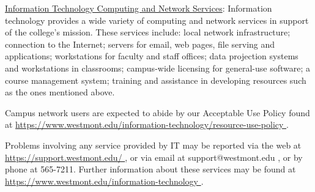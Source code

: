 		\underline{Information Technology Computing and Network Services}:  Information technology provides a wide variety of computing and network services in support of the college's mission.  These services include:  local network infrastructure; connection to the Internet; servers for email, web pages, file serving and applications; workstations for faculty and staff offices; data projection systems and workstations in classrooms; campus-wide licensing for general-use software; a course management system; training and assistance in developing resources such as the ones mentioned above.

		Campus network users are expected to abide by our Acceptable Use Policy found at
		\href{
			https://www.westmont.edu/information-technology/resource-use-policy
		}{\url{
				https://www.westmont.edu/information-technology/resource-use-policy
			}}
		.

		Problems involving any service provided by IT may be reported via the web at
		\href{
			https://support.westmont.edu/
		}{\url{
				https://support.westmont.edu/
			}}
		,
		or via email at support@westmont.edu
		,
		or by phone at 565-7211.  Further information about these services may be found at
		\href{
			https://www.westmont.edu/information-technology
		}{\url{
				https://www.westmont.edu/information-technology
			}}
		.